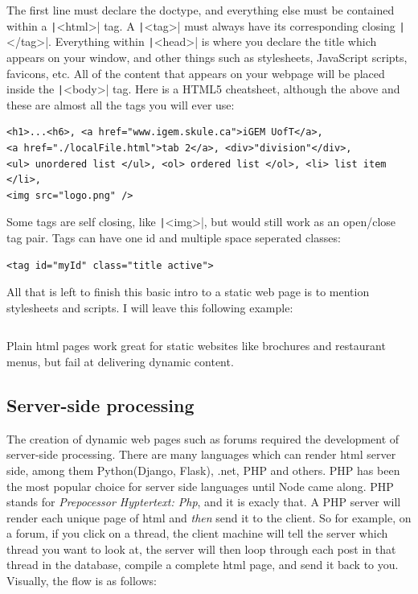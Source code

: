 \inputminted{html}{files/html/helloworld.html}

The first line must declare the doctype, and everything else must be contained
within a \texttt|<html>| tag. A \texttt|<tag>| must always
have its corresponding closing \texttt|</tag>|. Everything within 
\texttt|<head>| is where you declare the title which appears on your
window, and other things such as stylesheets, JavaScript scripts, favicons, etc.
All of the content that appears on your webpage will be placed inside the
\texttt|<body>| tag. Here is a HTML5 cheatsheet, although the above
and these are almost all the tags you will ever use:

\begin{verbatim}
<h1>...<h6>, <a href="www.igem.skule.ca">iGEM UofT</a>, 
<a href="./localFile.html">tab 2</a>, <div>"division"</div>, 
<ul> unordered list </ul>, <ol> ordered list </ol>, <li> list item </li>,
<img src="logo.png" />
\end{verbatim}

Some tags are self closing, like \texttt|<img>|, but would still work
as an open/close tag pair. Tags can have one id and multiple space seperated
classes:

\begin{verbatim}
<tag id="myId" class="title active">
\end{verbatim}

All that is left to finish this basic intro to a static web page is to mention
stylesheets and scripts. I will leave this following example:

\inputminted{html}{files/html/DNA.html}

Plain html pages work great for static websites like brochures and restaurant
menus, but fail at delivering dynamic content. 

\subsection{Server-side processing}

The creation of dynamic web pages such as forums required the development of
server-side processing. There are many languages which can render html server
side, among them Python(Django, Flask), .net, PHP and others. PHP has been the
most popular choice for server side languages until Node came along. PHP stands
for \textit{Prepocessor Hyptertext: Php}, and it is exacly that. A PHP server
will render each unique page of html and \textit{then} send it to the client. So
for example, on a forum, if you click on a thread, the client machine will tell
the server which thread you want to look at, the server will then loop through
each post in that thread in the database, compile a complete html page, and send
it back to you. Visually, the flow is as follows:

